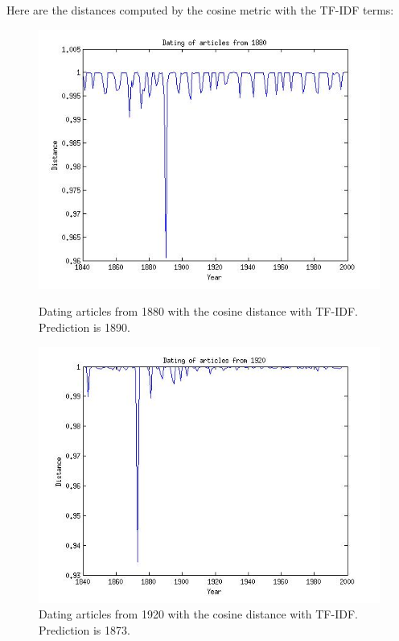 Here are the distances computed by the cosine metric with the TF-IDF terms:
\begin{figure}[H]
    \begin{minipage}[b]{0.3\linewidth}
        \includegraphics[scale=0.25]{Pictures/date_articles/cos/dating1880_tfidf.jpg}
        \caption{Dating articles from 1880 with the cosine distance with TF-IDF. Prediction is 1890.}
    \end{minipage}\hfill
    \begin{minipage}[b]{0.3\linewidth}
        \includegraphics[scale=0.25]{Pictures/date_articles/cos/dating1920_tfidf.jpg}
        \caption{Dating articles from 1920 with the cosine distance with TF-IDF. Prediction is 1873.}

\end{minipage}
\end{figure}
